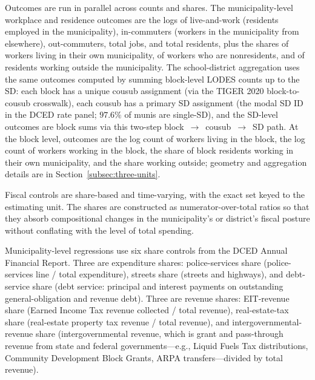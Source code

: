 \documentclass[12pt]{article}
\begin{document}
Outcomes are run in parallel across counts and shares. The
municipality-level workplace and residence outcomes are the logs of
live-and-work (residents employed in the municipality),
in-commuters (workers in the municipality from elsewhere),
out-commuters, total jobs, and
total residents, plus the shares of workers living in their
own municipality, of workers who are nonresidents, and of residents working
outside the municipality. The school-district aggregation uses the same outcomes computed by
summing block-level LODES counts up to the SD: each block has a
unique cousub assignment (via the TIGER 2020 block-to-cousub
crosswalk), each cousub has a primary SD assignment (the modal
SD ID in the DCED rate panel; $97.6\%$ of munis are
single-SD), and the SD-level outcomes are block sums via this
two-step block~$\to$~cousub~$\to$~SD path. At the
block level, outcomes are the log count of workers living in the
block, the log count of workers working in the block, the share of
block residents working in their own municipality, and the share working
outside; geometry and aggregation details are in
Section~\ref{subsec:three-units}.

Fiscal controls are share-based and time-varying, with the exact set
keyed to the estimating unit. The shares are constructed as
numerator-over-total ratios so that they absorb compositional changes
in the municipality's or district's fiscal posture without conflating with
the level of total spending.

Municipality-level regressions use six share controls from the DCED
Annual Financial Report. Three are expenditure shares:
police-services share (police-services line / total expenditure),
streets share (streets and highways), and
debt-service share (debt service: principal and interest
payments on outstanding general-obligation and revenue debt). Three
are revenue shares: EIT-revenue share (Earned Income Tax revenue
collected / total revenue), real-estate-tax share (real-estate property
tax revenue / total revenue), and intergovernmental-revenue share
(intergovernmental revenue, which is grant and pass-through revenue
from state and federal governments---e.g., Liquid Fuels Tax
distributions, Community Development Block Grants, ARPA transfers---divided
by total revenue).
\end{document}
